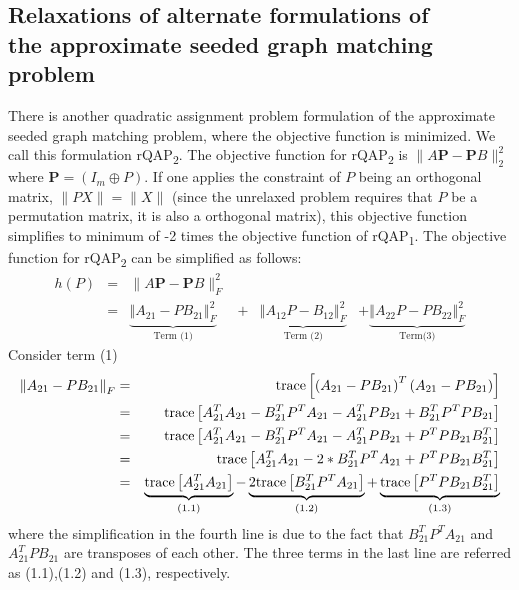 \documentclass[12pt,oneside,final]{thesis}\usepackage[]{graphicx}\usepackage[]{color}
\begin{document}
\subsection{Relaxations of alternate formulations of \\ the approximate seeded graph matching problem \label{subsec:rqap2}}
There is another quadratic assignment problem formulation of  the approximate seeded graph matching problem, where the objective function is  minimized. We call this formulation rQAP\textsubscript{2}.
The objective function for rQAP\textsubscript{2} is
$\|A\bm{P}-\bm{P}B\|_2^2$ where $\bm{P}=(I_m\oplus P)$. If one applies the constraint of $P$ being an orthogonal matrix, \ie $\|PX\|=\|X\|$ (since the unrelaxed problem requires that $P$ be a permutation matrix, it is also a orthogonal matrix), this objective function simplifies to minimum of -2 times the objective function of  rQAP\textsubscript{1}. The objective function for  rQAP\textsubscript{2} can be simplified as follows:
\begin{align*}
h(P) & = & \lVert A\bm{P}-\bm{P}B\rVert _{F}^2\\
 & = & \underbrace{{\left\Vert A_{21}-PB_{21}\right\Vert _{F}^2}}_{\textrm{Term (1)}} & + & \underbrace{{\left\Vert A_{12}P-B_{12}\right\Vert _{F}^2}}_{\textrm{Term (2)}} & + \underbrace{{\left\Vert A_{22}P-PB_{22}\right\Vert _{F}^2}}_{\textrm{Term(3)} } 
\end{align*}
Consider term (1)
\begin{align*}
\left\Vert A_{21}-PB_{21}\right\Vert _{F} & = & \textup{trace}\left[\left(A_{21}-PB_{21}\right)^{T}\left(A_{21}-PB_{21}\right)\right]\\
 & = & \textup{trace}\left[A_{21}^{T}A_{21}-B_{21}^{T}P^{T}A_{21}-A_{21}^{T}PB_{21}+B_{21}^{T}P^{T}PB_{21}\right]\\
 & = & \textup{trace}\left[A_{21}^{T}A_{21}-B_{21}^{T}P^{T}A_{21}-A_{21}^{T}PB_{21}+P^{T}PB_{21}B_{21}^{T}\right]\\
 & = & \textup{trace}\left[A_{21}^{T}A_{21}-2*B_{21}^{T}P^{T}A_{21}+P^{T}PB_{21}B_{21}^{T}\right] \\
 & = & \underbrace{\textup{trace}\left[A_{21}^{T}A_{21}\right]}_{(1.1)}
 -\underbrace{2\textup{trace}\left[ B_{21}^{T}P^{T}A_{21}\right]}_{(1.2)}
 +\underbrace{\textup{trace}\left[P^{T}PB_{21}B_{21}^{T}\right]}_{(1.3)}
\end{align*}
where the simplification in the fourth line is due to the fact that $B_{21}^{T}P^{T}A_{21}$ and $A_{21}^{T}PB_{21}$
 are transposes of each other.
The three terms  in the last line are referred
as (1.1),(1.2) and (1.3), respectively.
\end{document}
